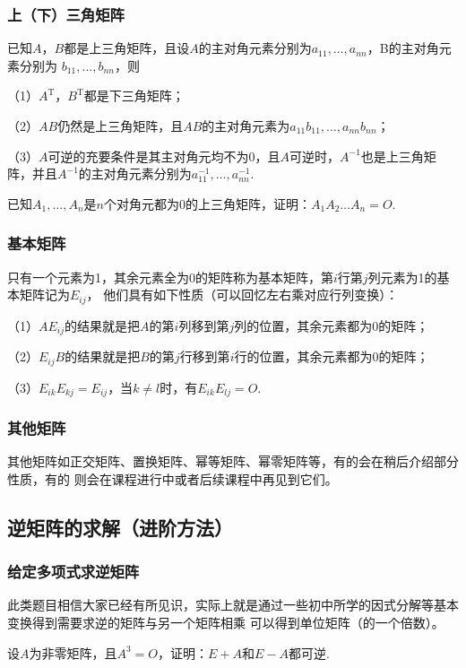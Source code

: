 \subsubsection{上（下）三角矩阵}
\begin{theorem}
	已知$A$，$B$都是上三角矩阵，且设$A$的主对角元素分别为$a_{11},\dots,a_{nn}$，B的主对角元素分别为
	$b_{11},\dots,b_{nn}$，则
	
	\textup{（1）}$A^{\mathrm{T}}$，$B^\mathrm{T}$都是下三角矩阵；
	
	\textup{（2）}$AB$仍然是上三角矩阵，且$AB$的主对角元素为$a_{11}b_{11},\dots,a_{nn}b_{nn}$；
	
	\textup{（3）}$A$可逆的充要条件是其主对角元均不为$0$，且$A$可逆时，$A^{-1}$也是上三角矩阵，并且$A^{-1}$的主对角元素分别为$a_{11}^{-1},\dots,a_{nn}^{-1}$.
\end{theorem}

\begin{example}
	已知$A_1,\dots,A_n$是$n$个对角元都为$0$的上三角矩阵，证明：$A_1A_2\dots A_n=O$.
\end{example}

\subsubsection{基本矩阵}
只有一个元素为1，其余元素全为0的矩阵称为基本矩阵，第$i$行第$j$列元素为1的基本矩阵记为$E_{ij}$，
他们具有如下性质（可以回忆左右乘对应行列变换）：
\begin{theorem}

	\textup{（1）}$AE_{ij}$的结果就是把$A$的第$i$列移到第$j$列的位置，其余元素都为$0$的矩阵；
	
	\textup{（2）}$E_{ij}B$的结果就是把$B$的第$j$行移到第$i$行的位置，其余元素都为$0$的矩阵；
	
	\textup{（3）}$E_{ik}E_{kj}=E_{ij}$，当$k \neq l$时，有$E_{ik}E_{lj}=O$.
\end{theorem}

\subsubsection{其他矩阵}
其他矩阵如正交矩阵、置换矩阵、幂等矩阵、幂零矩阵等，有的会在稍后介绍部分性质，有的
则会在课程进行中或者后续课程中再见到它们。

\subsection{逆矩阵的求解（进阶方法）}
\subsubsection{给定多项式求逆矩阵}
此类题目相信大家已经有所见识，实际上就是通过一些初中所学的因式分解等基本变换得到需要求逆的矩阵与另一个矩阵相乘
可以得到单位矩阵（的一个倍数）。
\begin{example}
	设$A$为非零矩阵，且$A^3=O$，证明：$E+A$和$E-A$都可逆.
\end{example}

